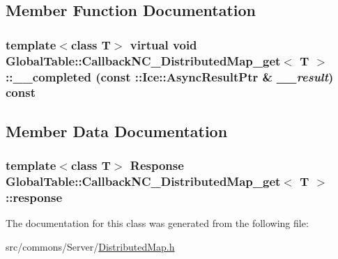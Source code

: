 \subsection{Member Function Documentation}
\hypertarget{class_global_table_1_1_callback_n_c___distributed_map__get_a636789ca8e06afc266d57e8a7e6681bd}{
\subsubsection[{\_\-\_\-completed}]{\setlength{\rightskip}{0pt plus 5cm}template$<$class T$>$ virtual void {\bf GlobalTable::CallbackNC\_\-DistributedMap\_\-get}$<$ T $>$::\_\-\_\-completed (const ::Ice::AsyncResultPtr \& {\em \_\-\_\-result}) const}}
\label{class_global_table_1_1_callback_n_c___distributed_map__get_a636789ca8e06afc266d57e8a7e6681bd}


\subsection{Member Data Documentation}
\hypertarget{class_global_table_1_1_callback_n_c___distributed_map__get_a87468610207b42c22393a5e8eb154b3d}{
\subsubsection[{response}]{\setlength{\rightskip}{0pt plus 5cm}template$<$class T$>$ {\bf Response} {\bf GlobalTable::CallbackNC\_\-DistributedMap\_\-get}$<$ T $>$::{\bf response}}}
\label{class_global_table_1_1_callback_n_c___distributed_map__get_a87468610207b42c22393a5e8eb154b3d}


The documentation for this class was generated from the following file:\begin{DoxyCompactItemize}
\item 
src/commons/Server/\hyperlink{_distributed_map_8h}{DistributedMap.h}\end{DoxyCompactItemize}
